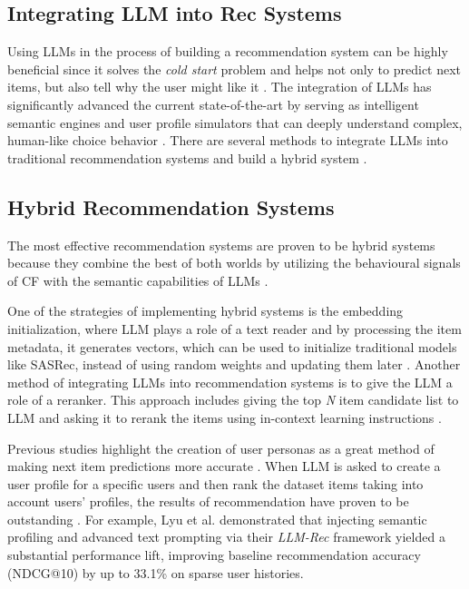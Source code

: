 \documentclass[conference]{IEEEtran}
\begin{document}
\subsection{Integrating LLM into Rec Systems}
Using LLMs in the process of building a recommendation system can be highly beneficial since it solves the \textit{cold start} problem and helps not only to predict next items, but also tell why the user might like it  \cite{b11, b12, b18,b19}. The integration of LLMs has significantly advanced the current state-of-the-art by serving as intelligent semantic engines and user profile simulators that can deeply understand complex, human-like choice behavior \cite{b2,b5,b11,b14}. There are several methods to integrate LLMs into traditional recommendation systems and build a hybrid system \cite{b2,b4,b19, b10}.


\subsection{Hybrid Recommendation Systems}
The most effective recommendation systems are proven to be hybrid systems because they combine the best of both worlds by utilizing the behavioural signals of CF with the semantic capabilities of LLMs \cite{b1,b2, b4,b8, b19, b20}. 

One of the strategies of implementing hybrid systems is the embedding initialization, where LLM plays a role of a text reader and by processing the item metadata, it generates vectors, which can be used to initialize traditional models like SASRec, instead of using random weights and updating them later \cite{b2,b6}. Another method of integrating LLMs into recommendation systems is to give the LLM a role of a reranker\cite{b9,b20}. This approach includes giving the top \textit{N} item candidate list to LLM and asking it to rerank the items using in-context learning instructions \cite{b2, b13}. 

Previous studies highlight the creation of user personas as a great method of making next item predictions more accurate \cite{b3,b7}. When LLM is asked to create a user profile for a specific users and then rank the dataset items taking into account users’ profiles, the results of recommendation have proven to be outstanding \cite{b3,b11}. For example, Lyu et al. \cite{b3} demonstrated that injecting semantic profiling and advanced text prompting via their \textit{LLM-Rec} framework yielded a substantial performance lift, improving baseline recommendation accuracy (NDCG@10) by up to 33.1\% on sparse user histories. 
\end{document}
